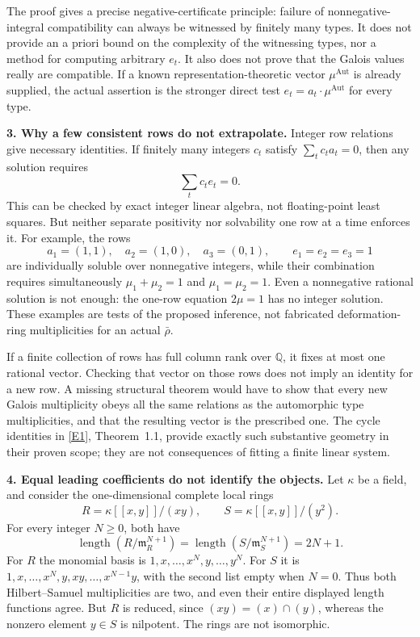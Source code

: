 \documentclass[11pt,a4paper]{article}
\newcommand{\Q}{\mathbb{Q}}
\newcommand{\eref}[2]{\hyperlink{extra:#1:#2}{[E#2]}}
\numberwithin{equation}{section}
\begin{document}
The proof gives a precise negative-certificate principle: failure of
nonnegative-integral compatibility can always be witnessed by finitely
many types. It does not provide an a priori bound on the complexity
of the witnessing types, nor a method for computing arbitrary $e_t$.
It also does not prove that the Galois values really are compatible.
If a known representation-theoretic vector $\mu^{\mathrm{Aut}}$ is
already supplied, the actual assertion is the stronger direct test
$e_t=a_t\cdot\mu^{\mathrm{Aut}}$ for every type.

\textbf{3. Why a few consistent rows do not extrapolate.}
Integer row relations give necessary identities. If finitely many
integers $c_t$ satisfy $\sum_t c_t a_t=0$, then any solution requires
\begin{equation}\label{statement:rowrelation}
 \sum_t c_t e_t=0.
\end{equation}
This can be checked by exact integer linear algebra, not floating-point
least squares. But neither separate positivity nor solvability one row
at a time enforces it. For example, the rows
\[
 a_1=(1,1),\quad a_2=(1,0),\quad a_3=(0,1),
 \qquad e_1=e_2=e_3=1
\]
are individually soluble over nonnegative integers, while their
combination requires simultaneously $\mu_1+\mu_2=1$ and
$\mu_1=\mu_2=1$. Even a nonnegative rational solution is not enough:
the one-row equation $2\mu=1$ has no integer solution. These examples
are tests of the proposed inference, not fabricated deformation-ring
multiplicities for an actual $\bar\rho$.

If a finite collection of rows has full column rank over $\Q$, it fixes
at most one rational vector. Checking that vector on those rows does
not imply an identity for a new row. A missing structural theorem would
have to show that every new Galois multiplicity obeys all the same
relations as the automorphic type multiplicities, and that the resulting
vector is the prescribed one. The cycle identities in
\eref{statement}{1}, Theorem~1.1, provide exactly such substantive geometry
in their proven scope; they are not consequences of fitting a finite
linear system.

\textbf{4. Equal leading coefficients do not identify the objects.}
Let $\kappa$ be a field, and consider the one-dimensional complete local
rings
\[
 R=\kappa[[x,y]]/(xy),\qquad S=\kappa[[x,y]]/(y^2).
\]
For every integer $N\ge0$, both have
\begin{equation}\label{statement:length}
 \operatorname{length}(R/\mathfrak m_R^{N+1})
 =\operatorname{length}(S/\mathfrak m_S^{N+1})=2N+1.
\end{equation}
For $R$ the monomial basis is $1,x,\ldots,x^N,y,\ldots,y^N$.
For $S$ it is $1,x,\ldots,x^N,y,xy,\ldots,x^{N-1}y$, with the
second list empty when $N=0$. Thus both Hilbert--Samuel multiplicities
are two, and even their entire displayed length functions agree.
But $R$ is reduced, since $(xy)=(x)\cap(y)$, whereas the nonzero element
$y\in S$ is nilpotent. The rings are not isomorphic.
\end{document}
